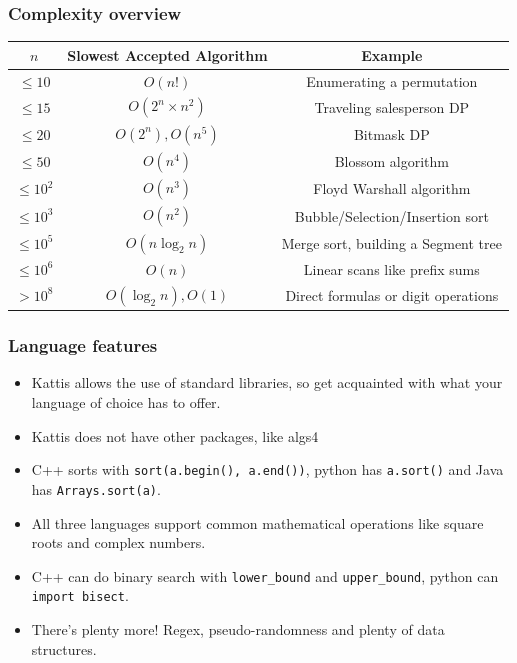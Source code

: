 \documentclass{beamer}
\begin{document}
\begin{frame}[plain]
    \frametitle{Complexity overview}
    \scriptsize
    \begin{center}
        \begin{tabular}{c|c|c}
            $n$ & Slowest Accepted Algorithm & Example \\
            \hline
            $\leq 10$ & $O(n!)$ & Enumerating a permutation \\
            $\leq 15$ & $O(2^n\times n^2)$ & Traveling salesperson DP \\
            $\leq 20$ & $O(2^n), O(n^5)$ & Bitmask DP \\
            $\leq 50$ & $O(n^4)$ & Blossom algorithm \\
            $\leq 10^2$ & $O(n^3)$ & Floyd Warshall algorithm \\
            $\leq 10^3$ & $O(n^2)$ & Bubble/Selection/Insertion sort \\
            $\leq 10^5$ & $O(n\log_2{n})$ & Merge sort, building a Segment tree \\
            $\leq 10^6$ & $O(n)$ & Linear scans like prefix sums \\
            $> 10^8$ & $O(\log_2{n}), O(1)$ & Direct formulas or digit operations \\
        \end{tabular}
    \end{center}
\end{frame}

\begin{frame}[plain]
    \frametitle{Language features}
    \begin{itemize}
        \item Kattis allows the use of standard libraries, so get acquainted with what your language of choice has to offer.
        \item Kattis does not have other packages, like algs4
        \item C++ sorts with \texttt{sort(a.begin(), a.end())}, python has \texttt{a.sort()} and Java has \texttt{Arrays.sort(a)}.
        \item All three languages support common mathematical operations like square roots and complex numbers.
        \item C++ can do binary search with \texttt{lower\_bound} and \texttt{upper\_bound}, python can \texttt{import bisect}.
        \item There's plenty more! Regex, pseudo-randomness and plenty of data structures.
    \end{itemize}
\end{frame}
\end{document}
